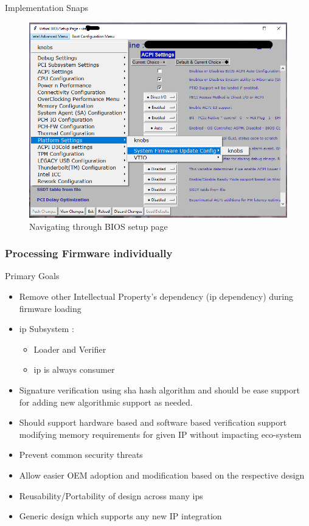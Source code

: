 \begin{frame}[allowframebreaks]{Implementation Snaps}
    \begin{figure}[htbp]
        \centering
        \includegraphics[width=0.6\linewidth]{Im/figures/proposed-work/bios-gui-accessing-menu}
        \caption{Navigating through BIOS setup page}\label{fig:proposed-work-bios-gui-accessing-menu}
    \end{figure}
\end{frame}

\subsubsection{Processing Firmware individually}
\begin{frame}{Primary Goals}
    \begin{itemize}
        \item Remove other Intellectual Property's dependency (\gls{ip} dependency) during firmware loading
        \item \gls{ip} Subsystem :
        \begin{itemize}
            \item Loader and Verifier
            \item \gls{ip} is always consumer
        \end{itemize}
        \item Signature verification using \gls{sha} hash algorithm and should be ease support for adding new algorithmic support as needed.
        \item Should support hardware based and software based verification support
        modifying memory requirements for given IP without impacting eco-system
        \item Prevent common security threats
        \item Allow easier OEM adoption and modification based on the respective design
        \item Reusability/Portability of design across many \gls{ip}s
        \item Generic design which supports any new IP integration
    \end{itemize}
\end{frame}

